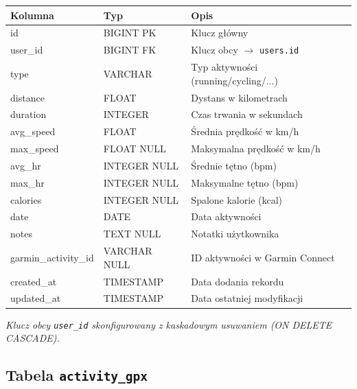 \documentclass[12pt,a4paper]{report}
\begin{document}
\begin{center}
\begin{tabularx}{\textwidth}{|l|l|X|}
\hline
\textbf{Kolumna}        & \textbf{Typ}              & \textbf{Opis}                        \\
\hline
id                      & BIGINT PK                 & Klucz główny                         \\
user\_id                & BIGINT FK                 & Klucz obcy $\to$ \texttt{users.id}   \\
type                    & VARCHAR                   & Typ aktywności (running/cycling/...)  \\
distance                & FLOAT                     & Dystans w kilometrach                \\
duration                & INTEGER                   & Czas trwania w sekundach             \\
avg\_speed              & FLOAT                     & Średnia prędkość w km/h              \\
max\_speed              & FLOAT NULL                & Maksymalna prędkość w km/h           \\
avg\_hr                 & INTEGER NULL              & Średnie tętno (bpm)                  \\
max\_hr                 & INTEGER NULL              & Maksymalne tętno (bpm)               \\
calories                & INTEGER NULL              & Spalone kalorie (kcal)               \\
date                    & DATE                      & Data aktywności                      \\
notes                   & TEXT NULL                 & Notatki użytkownika                  \\
garmin\_activity\_id    & VARCHAR NULL              & ID aktywności w Garmin Connect       \\
created\_at             & TIMESTAMP                 & Data dodania rekordu                 \\
updated\_at             & TIMESTAMP                 & Data ostatniej modyfikacji           \\
\hline
\end{tabularx}
\end{center}

\textit{Klucz obcy \texttt{user\_id} skonfigurowany z kaskadowym usuwaniem (ON DELETE CASCADE).}

\subsection{Tabela \texttt{activity\_gpx}}
\end{document}
